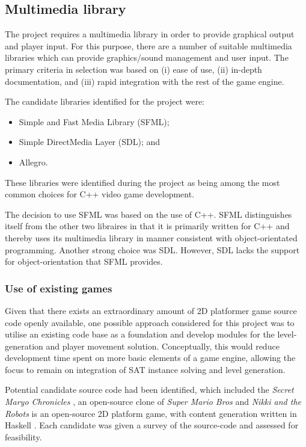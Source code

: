\documentclass[11pt, a4paper, oneside]{report} %
\begin{document}
\subsection{Multimedia library}

The project requires a multimedia library in order to provide graphical output
and player input. For this purpose, there are a number of suitable multimedia
libraries which can provide graphics/sound management and user input. The
primary criteria in selection was based on (i) ease of use, (ii) in-depth
documentation, and (iii) rapid integration with the rest of the game engine.

The candidate libraries identified for the project were:
\begin{itemize}
\item Simple and Fast Media Library (SFML);
\item Simple DirectMedia Layer (SDL); and 
\item Allegro.
\end{itemize}
These libraries were identified during the project as being among the most
common choices for C++ video game development.

The decision to use SFML was based on the use of C++. SFML distinguishes itself
from the other two libraires in that it is primarily written for C++ and thereby
uses its multimedia library in manner consistent with object-orientated
programming. Another strong choice was SDL. However, SDL lacks the support for
object-orientation that SFML provides. 

\subsubsection{Use of existing games}

Given that there exists an extraordinary amount of 2D platformer game source
code openly available, one possible approach considered for this project was to
utilise an existing code base as a foundation and develop modules for the level-
generation and player movement solution. Conceptually, this would reduce
development time spent on more basic elements of a game engine, allowing the
focus to remain on integration of SAT instance solving and level generation.

Potential candidate source code had been identified, which included the
\textit{Secret Maryo Chronicles} \cite{supermaryo}, an open-source clone of
\textit{Super Mario Bros} and \textit{Nikki and the Robots} is an open-source 2D
platform game, with content generation written in Haskell \cite{nikki}. Each
candidate was given a survey of the source-code and assessed for feasibility.
\end{document}
